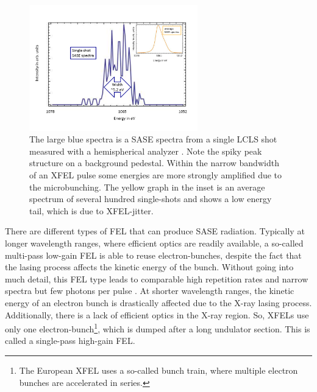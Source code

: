 \begin{figure}
	\centering
		\includegraphics[width=0.65\textwidth]{images/SASE-spectra.png}
	\caption[SASE single-shot and average spectra.]{The large blue spectra is a SASE spectra from a single LCLS shot measured with a hemispherical analyzer \citep{Bucher-2014-Unpublished}. Note the spiky peak structure on a background pedestal. Within the narrow bandwidth of an XFEL pulse some energies are more strongly amplified due to the microbunching. The yellow graph in the inset is an average spectrum of several hundred single-shots and shows a low energy tail, which is due to XFEL-jitter.}
	\label{fig:SASE-spectra}
\end{figure}
%
There are different types of FEL that can produce SASE radiation. Typically at longer wavelength ranges, where efficient optics are readily available, a so-called multi-pass low-gain FEL is able to reuse electron-bunches, despite the fact that the lasing process affects the kinetic energy of the bunch. Without going into much detail, this FEL type leads to comparable high repetition rates and narrow spectra but few photons per pulse \citep{Kim-2008-PRL}. At shorter wavelength ranges, the kinetic energy of an electron bunch is drastically affected due to the X-ray lasing process. Additionally, there is a lack of efficient optics in the X-ray region. So, XFELs use only one electron-bunch\footnote{The European XFEL uses a so-called bunch train, where multiple electron bunches are accelerated in series.}, which is dumped after a long undulator section. This is called a single-pass high-gain FEL.
%
%
%
%
